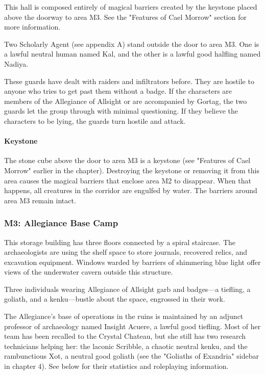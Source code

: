 \documentclass[10pt,a4paper,twoside,bg=print,twocolumn,openany,nodeprecatedcode]{dndbook}
\begin{document}
This hall is composed entirely of magical barriers created by the keystone placed above the doorway to area M3. See the "Features of Cael Morrow" section for more information.

Two Scholarly Agent (see appendix A) stand outside the door to area M3. One is a lawful neutral human named Kal, and the other is a lawful good halfling named Nadiya.

These guards have dealt with raiders and infiltrators before. They are hostile to anyone who tries to get past them without a badge. If the characters are members of the Allegiance of Allsight or are accompanied by Gortag, the two guards let the group through with minimal questioning. If they believe the characters to be lying, the guards turn hostile and attack.

\paragraph{Keystone}
The stone cube above the door to area M3 is a keystone (see "Features of Cael Morrow" earlier in the chapter). Destroying the keystone or removing it from this area causes the magical barriers that enclose area M2 to disappear. When that happens, all creatures in the corridor are engulfed by water. The barriers around area M3 remain intact.



\subsubsection{M3: Allegiance Base Camp}
\begin{DndReadAloud}{}
This storage building has three floors connected by a spiral staircase. The archaeologists are using the shelf space to store journals, recovered relics, and excavation equipment. Windows warded by barriers of shimmering blue light offer views of the underwater cavern outside this structure.

Three individuals wearing Allegiance of Allsight garb and badges—a tiefling, a goliath, and a kenku—bustle about the space, engrossed in their work.

\end{DndReadAloud}

The Allegiance's base of operations in the ruins is maintained by an adjunct professor of archaeology named Insight Acuere, a lawful good tiefling. Most of her team has been recalled to the Crystal Chateau, but she still has two research technicians helping her: the laconic Scribble, a chaotic neutral kenku, and the rambunctious Xot, a neutral good goliath (see the "Goliaths of Exandria" sidebar in chapter 4). See below for their statistics and roleplaying information.
\end{document}
